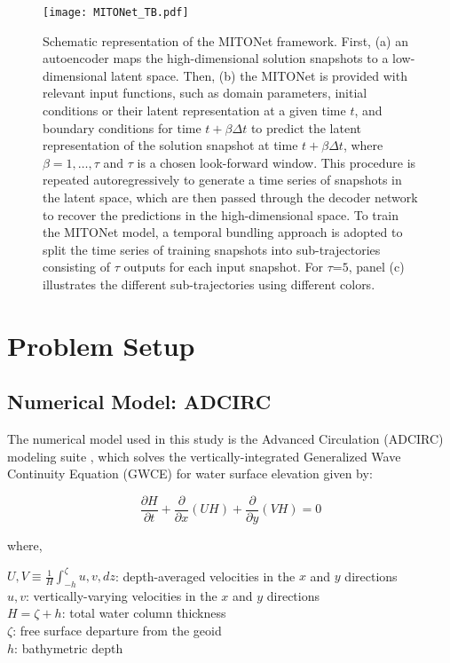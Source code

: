 \documentclass[draft]{agujournal2019}
\begin{document}
\begin{figure}[h]
    \centering
    \texttt{[image: MITONet\_TB.pdf]}
    \caption{Schematic representation of the MITONet framework. First, (a) an autoencoder maps the high-dimensional solution snapshots to a low-dimensional latent space. Then, (b) the MITONet is provided with relevant input functions, such as domain parameters, initial conditions or their latent representation at a given time $t$, and boundary conditions for time $t+\beta \Delta t$ to predict the latent representation of the solution snapshot at time $t + \beta \Delta t$, where $\beta = 1, \ldots, \tau$ and $\tau$ is a chosen look-forward window. This procedure is repeated autoregressively to generate a time series of snapshots in the latent space, which are then passed through the decoder network to recover the predictions in the high-dimensional space. To train the MITONet model, a temporal bundling approach is adopted to split the time series of training snapshots into sub-trajectories consisting of $\tau$ outputs for each input snapshot. For $\tau$=$5$, panel (c) illustrates the different sub-trajectories using different colors.}
    \label{fig:mitonet}
\end{figure}

\section{Problem Setup}
\subsection{Numerical Model: ADCIRC}

The numerical model used in this study is the Advanced Circulation (ADCIRC) modeling suite \cite{luettich1992adcirc}, which solves the vertically-integrated Generalized Wave Continuity Equation (GWCE) for water surface elevation \cite{luettich2004formulation} given by:

\begin{equation} \frac{\partial{H}}{\partial{t}} + \frac{\partial}{\partial{x}}(UH) + \frac{\partial}{\partial{y}}(VH)=0 \label{eq:2DSW1} \end{equation}

\noindent where,

\noindent $U, V \equiv \frac{1}{H} \int_{-h}^{\zeta} u,v , dz$: depth-averaged velocities in the $x$ and $y$ directions\\
$u, v$: vertically-varying velocities in the $x$ and $y$ directions\\
$H=\zeta + h$: total water column thickness\\
$\zeta$: free surface departure from the geoid\\
$h$: bathymetric depth
\end{document}
